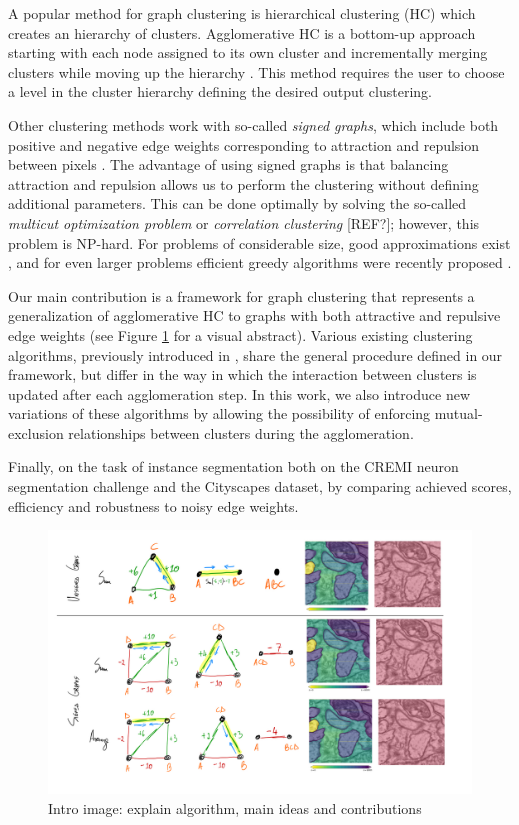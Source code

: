 A popular method for graph clustering is hierarchical clustering (HC) which creates an hierarchy of clusters. Agglomerative HC is a bottom-up approach starting with each node assigned to its own cluster and incrementally merging clusters while moving up the hierarchy \cite{lance1967general}. This method requires the user to choose a level in the cluster hierarchy defining the desired output clustering. 

Other clustering methods work with so-called \emph{signed graphs}, which include both positive and negative edge weights corresponding to attraction and repulsion between pixels . The advantage of using signed graphs is that balancing attraction and repulsion allows us to perform the clustering without defining additional parameters. This can be done optimally by solving the so-called \emph{multicut optimization problem} or \emph{correlation clustering} [REF?]; however, this problem is NP-hard. For problems of considerable size, good approximations exist \cite{yarkony2012fast,pape2017solving}, and for even larger problems efficient greedy algorithms were recently proposed \cite{levinkov2017comparative,wolf2018mutex}.

Our main contribution is a framework for graph clustering that represents a generalization of agglomerative HC to graphs with both attractive and repulsive edge weights (see Figure \ref{fig:intro_figure} for a visual abstract). 
Various existing clustering algorithms, previously introduced in \cite{levinkov2017comparative,wolf2018mutex,lance1967general}, share the general procedure defined in our framework, but differ in the way in which the interaction between clusters is updated after each agglomeration step. In this work, we also introduce new variations of these algorithms by allowing the possibility of enforcing mutual-exclusion relationships between clusters during the agglomeration.  

Finally,  on the task of instance segmentation both on the CREMI neuron segmentation challenge and the Cityscapes dataset, by comparing achieved scores, efficiency and robustness to noisy edge weights.





\begin{figure}[t]
\centering
\includegraphics[width=\textwidth,trim=0.4in 1.2in 0.in 0.05in,clip]{./figs/intro_image.jpg} %
\caption{\small 
Intro image: explain algorithm, main ideas and contributions
\label{fig:intro_figure}}
\end{figure}
